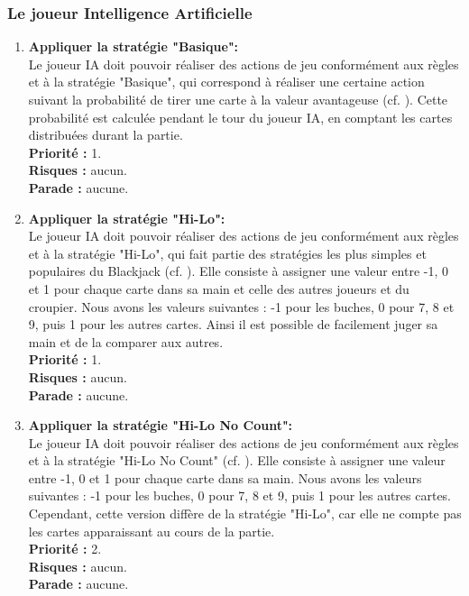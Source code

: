 \subsubsection{Le joueur Intelligence Artificielle}
\label{sec:ia}
\begin{enumerate}
    \item \textbf{Appliquer la stratégie "Basique":} \\
        Le joueur IA doit pouvoir réaliser des actions de jeu conformément aux règles et à la stratégie "Basique", qui correspond à réaliser une certaine action suivant la probabilité de tirer une carte à la valeur avantageuse (cf. ).
        Cette probabilité est calculée pendant le tour du joueur IA, en comptant les cartes distribuées durant la partie.\\
        \textbf{Priorité :} 1. \\
        \textbf{Risques :} aucun. \\ 
        \textbf{Parade :} aucune.

    \item \textbf{Appliquer la stratégie "Hi-Lo":} \\
        Le joueur IA doit pouvoir réaliser des actions de jeu conformément aux règles et à la stratégie "Hi-Lo", qui fait partie des stratégies les plus simples et populaires du Blackjack (cf. ). 
        Elle consiste à assigner une valeur entre -1, 0 et 1 pour chaque carte dans sa main et celle des autres joueurs et du croupier. Nous avons les valeurs suivantes : -1 pour les buches, 0 pour 7, 8 et 9, puis 1 pour les autres cartes. Ainsi il est possible de facilement juger sa main et de la comparer aux autres.\\
        \textbf{Priorité :} 1. \\ 
        \textbf{Risques :} aucun. \\ 
        \textbf{Parade :} aucune.

    \item \textbf{Appliquer la stratégie "Hi-Lo No Count":} \\
        Le joueur IA doit pouvoir réaliser des actions de jeu conformément aux règles et à la stratégie "Hi-Lo No Count" (cf. ). 
        Elle consiste à assigner une valeur entre -1, 0 et 1 pour chaque carte dans sa main. Nous avons les valeurs suivantes : -1 pour les buches, 0 pour 7, 8 et 9, puis 1 pour les autres cartes. Cependant, cette version diffère de la stratégie "Hi-Lo", car elle ne compte pas les cartes apparaissant au cours de la partie.\\
        \textbf{Priorité :} 2. \\ 
        \textbf{Risques :} aucun. \\ 
        \textbf{Parade :} aucune.


\end{enumerate}
